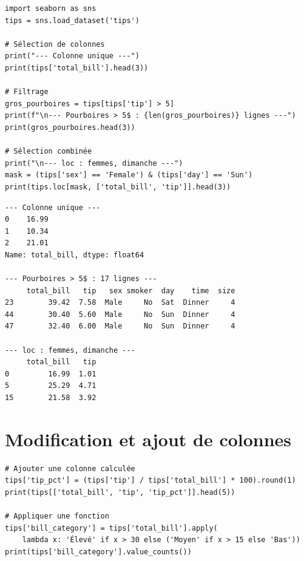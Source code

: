 \begin{codeblock}[title=\textbf{Python --- S\'election}]
\begin{verbatim}
import seaborn as sns
tips = sns.load_dataset('tips')

# Sélection de colonnes
print("--- Colonne unique ---")
print(tips['total_bill'].head(3))

# Filtrage
gros_pourboires = tips[tips['tip'] > 5]
print(f"\n--- Pourboires > 5$ : {len(gros_pourboires)} lignes ---")
print(gros_pourboires.head(3))

# Sélection combinée
print("\n--- loc : femmes, dimanche ---")
mask = (tips['sex'] == 'Female') & (tips['day'] == 'Sun')
print(tips.loc[mask, ['total_bill', 'tip']].head(3))
\end{verbatim}
\end{codeblock}

\begin{codeoutput}
\begin{verbatim}
--- Colonne unique ---
0    16.99
1    10.34
2    21.01
Name: total_bill, dtype: float64

--- Pourboires > 5$ : 17 lignes ---
     total_bill   tip   sex smoker  day    time  size
23        39.42  7.58  Male     No  Sat  Dinner     4
44        30.40  5.60  Male     No  Sun  Dinner     4
47        32.40  6.00  Male     No  Sun  Dinner     4

--- loc : femmes, dimanche ---
     total_bill   tip
0         16.99  1.01
5         25.29  4.71
15        21.58  3.92
\end{verbatim}
\end{codeoutput}

\section{Modification et ajout de colonnes}

\begin{codeblock}[title=\textbf{Python --- Nouvelles colonnes}]
\begin{verbatim}
# Ajouter une colonne calculée
tips['tip_pct'] = (tips['tip'] / tips['total_bill'] * 100).round(1)
print(tips[['total_bill', 'tip', 'tip_pct']].head(5))

# Appliquer une fonction
tips['bill_category'] = tips['total_bill'].apply(
    lambda x: 'Élevé' if x > 30 else ('Moyen' if x > 15 else 'Bas'))
print(tips['bill_category'].value_counts())
\end{verbatim}
\end{codeblock}

